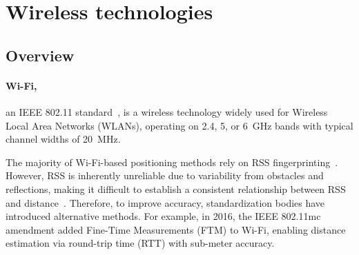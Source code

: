 




\section{Wireless technologies}

\subsection{Overview}
\paragraph{Wi-Fi,} an IEEE 802.11 standard~\cite{ieee80211}, is a wireless technology widely used for Wireless Local Area Networks (WLANs), operating on 2.4, 5, or 6~\si{\giga\hertz} bands with typical channel widths of 20~\si{\mega\hertz}.

The majority of Wi-Fi-based positioning methods rely on RSS fingerprinting~\cite{leitch2023indoor}. However, RSS is inherently unreliable due to variability from obstacles and reflections, making it difficult to establish a consistent relationship between RSS and distance~\cite{Asaad2022Review}. Therefore, to improve accuracy, standardization bodies have introduced alternative methods. For example, in 2016, the IEEE 802.11mc amendment added Fine-Time Measurements (FTM) to Wi-Fi, enabling distance estimation via round-trip time (RTT) with sub-meter accuracy.

